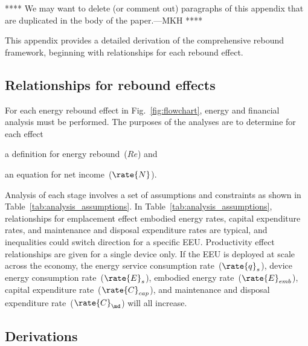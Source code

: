 

**** 
We may want to delete (or comment out)
paragraphs of this appendix that are duplicated
in the body of the paper.---MKH
****

This appendix provides a detailed derivation of the comprehensive rebound framework,
beginning with relationships for each rebound effect.


\subsection{Relationships for rebound effects}
\label{sec:relationships_for_stages}

For each energy rebound effect in Fig.~\ref{fig:flowchart},
energy and financial analysis must be performed.
The purposes of the analyses are to determine for each effect
%
\begin{enumerate*}[label={(\alph*)}]

  \item a definition for energy rebound~($Re$) and

  \item an equation for net income~($\rate{N}$).

\end{enumerate*}

Analysis of each stage involves a set of assumptions and constraints
as shown in Table~\ref{tab:analysis_assumptions}.
In Table~\ref{tab:analysis_assumptions}, 
relationships for emplacement effect 
embodied energy rates, 
capital expenditure rates, and 
maintenance and disposal expenditure rates
are typical, and
inequalities could switch direction for a specific EEU.
Productivity effect relationships are given for a single device only.
If the EEU is deployed at scale across the economy, 
the energy service consumption rate~($\rate{q}_s$), 
device energy consumption rate~($\rate{E}_s$), 
embodied energy rate~($\rate{E}_{emb}$),
capital expenditure rate~($\rate{C}_{cap}$), and 
maintenance and disposal expenditure rate~($\rate{C}_{\md}$)
will all increase.




\subsection{Derivations}
\label{sec:derivations}

